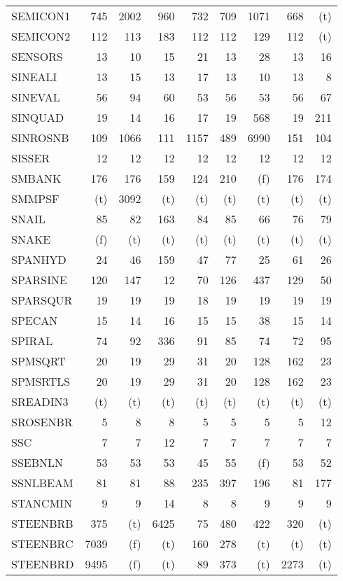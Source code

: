 \documentclass[11pt,twoside]{article}
\begin{document}
{\begin{longtable}[c]{|l|r|r|r|r|r|r|r|r|}
 SEMICON1 & 745 & 2002 & 960 & 732 & 709 & 1071 & 668 & (t) \\
 SEMICON2 & 112 & 113 & 183 & 112 & 112 & 129 & 112 & (t) \\
 SENSORS & 13 & 10 & 15 & 21 & 13 & 28 & 13 & 16 \\
 SINEALI & 13 & 15 & 13 & 17 & 13 & 10 & 13 & 8 \\
 SINEVAL & 56 & 94 & 60 & 53 & 56 & 53 & 56 & 67 \\
 SINQUAD & 19 & 14 & 16 & 17 & 19 & 568 & 19 & 211 \\
 SINROSNB & 109 & 1066 & 111 & 1157 & 489 & 6990 & 151 & 104 \\
 SISSER & 12 & 12 & 12 & 12 & 12 & 12 & 12 & 12 \\
 SMBANK & 176 & 176 & 159 & 124 & 210 & (f) & 176 & 174 \\
 SMMPSF & (t) & 3092 & (t) & (t) & (t) & (t) & (t) & (t) \\
 SNAIL & 85 & 82 & 163 & 84 & 85 & 66 & 76 & 79 \\
 SNAKE & (f) & (t) & (t) & (t) & (t) & (t) & (t) & (t) \\
 SPANHYD & 24 & 46 & 159 & 47 & 77 & 25 & 61 & 26 \\
 SPARSINE & 120 & 147 & 12 & 70 & 126 & 437 & 129 & 50 \\
 SPARSQUR & 19 & 19 & 19 & 18 & 19 & 19 & 19 & 19 \\
 SPECAN & 15 & 14 & 16 & 15 & 15 & 38 & 15 & 14 \\
 SPIRAL & 74 & 92 & 336 & 91 & 85 & 74 & 72 & 95 \\
 SPMSQRT & 20 & 19 & 29 & 31 & 20 & 128 & 162 & 23 \\
 SPMSRTLS & 20 & 19 & 29 & 31 & 20 & 128 & 162 & 23 \\
 SREADIN3 & (t) & (t) & (t) & (t) & (t) & (t) & (t) & (t) \\
 SROSENBR & 5 & 8 & 8 & 5 & 5 & 5 & 5 & 12 \\
 SSC & 7 & 7 & 12 & 7 & 7 & 7 & 7 & 7 \\
 SSEBNLN & 53 & 53 & 53 & 45 & 55 & (f) & 53 & 52 \\
 SSNLBEAM & 81 & 81 & 88 & 235 & 397 & 196 & 81 & 177 \\
 STANCMIN & 9 & 9 & 14 & 8 & 8 & 9 & 9 & 9 \\
 STEENBRB & 375 & (t) & 6425 & 75 & 480 & 422 & 320 & (t) \\
 STEENBRC & 7039 & (f) & (t) & 160 & 278 & (t) & (t) & (t) \\
 STEENBRD & 9495 & (f) & (t) & 89 & 373 & (t) & 2273 & (t) \\

\end{longtable}}
\end{document}
